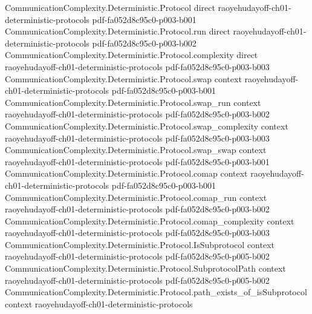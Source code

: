 \begin{lemma}
\label{CommunicationComplexity.Deterministic.Protocol.leafRectangles_disjoint}
\leanok
{}
\proofstep
  {CommunicationComplexity.Deterministic.Protocol}
  {direct}
  {raoyehudayoff-ch01-deterministic-protocols}
  {pdf-fa052d8c95c0-p003-b001}
\proofstep
  {CommunicationComplexity.Deterministic.Protocol.run}
  {direct}
  {raoyehudayoff-ch01-deterministic-protocols}
  {pdf-fa052d8c95c0-p003-b002}
\proofstep
  {CommunicationComplexity.Deterministic.Protocol.complexity}
  {direct}
  {raoyehudayoff-ch01-deterministic-protocols}
  {pdf-fa052d8c95c0-p003-b003}
\proofstep
  {CommunicationComplexity.Deterministic.Protocol.swap}
  {context}
  {raoyehudayoff-ch01-deterministic-protocols}
  {pdf-fa052d8c95c0-p003-b001}
\proofstep
  {CommunicationComplexity.Deterministic.Protocol.swap_run}
  {context}
  {raoyehudayoff-ch01-deterministic-protocols}
  {pdf-fa052d8c95c0-p003-b002}
\proofstep
  {CommunicationComplexity.Deterministic.Protocol.swap_complexity}
  {context}
  {raoyehudayoff-ch01-deterministic-protocols}
  {pdf-fa052d8c95c0-p003-b003}
\proofstep
  {CommunicationComplexity.Deterministic.Protocol.swap_swap}
  {context}
  {raoyehudayoff-ch01-deterministic-protocols}
  {pdf-fa052d8c95c0-p003-b001}
\proofstep
  {CommunicationComplexity.Deterministic.Protocol.comap}
  {context}
  {raoyehudayoff-ch01-deterministic-protocols}
  {pdf-fa052d8c95c0-p003-b001}
\proofstep
  {CommunicationComplexity.Deterministic.Protocol.comap_run}
  {context}
  {raoyehudayoff-ch01-deterministic-protocols}
  {pdf-fa052d8c95c0-p003-b002}
\proofstep
  {CommunicationComplexity.Deterministic.Protocol.comap_complexity}
  {context}
  {raoyehudayoff-ch01-deterministic-protocols}
  {pdf-fa052d8c95c0-p003-b003}
\proofstep
  {CommunicationComplexity.Deterministic.Protocol.IsSubprotocol}
  {context}
  {raoyehudayoff-ch01-deterministic-protocols}
  {pdf-fa052d8c95c0-p005-b002}
\proofstep
  {CommunicationComplexity.Deterministic.Protocol.SubprotocolPath}
  {context}
  {raoyehudayoff-ch01-deterministic-protocols}
  {pdf-fa052d8c95c0-p005-b002}
\proofstep
  {CommunicationComplexity.Deterministic.Protocol.path_exists_of_isSubprotocol}
  {context}
  {raoyehudayoff-ch01-deterministic-protocols}

\end{lemma}
